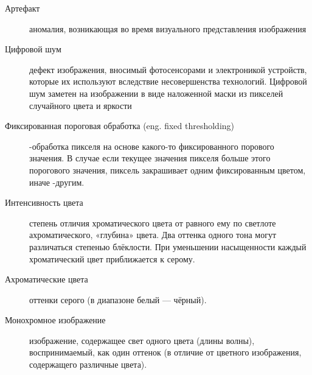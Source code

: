 \Defines %
\begin{description}
\item[Артефакт] 
 аномалия, возникающая во время визуального представления изображения\cite{Wiki}
\item[Цифровой шум] дефект изображения, вносимый фотосенсорами и электроникой устройств, которые их используют вследствие несовершенства технологий.
Цифровой шум заметен на изображении в виде наложенной маски из пикселей случайного цвета и яркости\cite{Wiki}

\item[Фиксированная пороговая обработка (eng. fixed thresholding)] -обработка пикселя на основе какого-то фиксированного порового значения. В случае если текущее значения пикселя больше этого порогового значения, пиксель закрашивает одним фиксированным цветом, иначе -другим. 
\cite{Dh}
\item[Интенсивность цвета]  степень отличия хроматического цвета от равного ему по светлоте ахроматического, «глубина» цвета. Два оттенка одного тона могут различаться степенью блёклости. При уменьшении насыщенности каждый хроматический цвет приближается к серому.\cite{Wiki}
\item[Ахроматические цвета] оттенки серого (в диапазоне белый — чёрный).\cite{Wiki}
\item[Монохромное изображение] изображение, содержащее свет одного цвета (длины волны), воспринимаемый, как один оттенок (в отличие от цветного изображения, содержащего различные цвета).\cite{Wiki}



\end{description}

